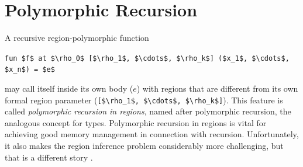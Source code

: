 \documentclass[12pt]{book}
\begin{document}
\section{Polymorphic Recursion}
\label{polyrec.sec}

A
%
%
recursive region-polymorphic function

\begin{center}
  \lstinline!fun $f$ at $\rho_0$ [$\rho_1$, $\cdots$, $\rho_k$] ($x_1$, $\cdots$, $x_n$) = $e$!
\end{center}
may call itself inside its own body ($e$) with regions that are different from
its own formal region parameter (\lstinline![$\rho_1$, $\cdots$, $\rho_k$]!).
This feature is called \emph{polymorphic recursion in regions}, named after
polymorphic recursion, the analogous concept for types.  Polymorphic recursion
in regions is vital for achieving good memory management in connection with
recursion.  Unfortunately, it also makes the region inference problem
considerably more challenging, but that is a different story \cite{tofbir98}.
\end{document}
